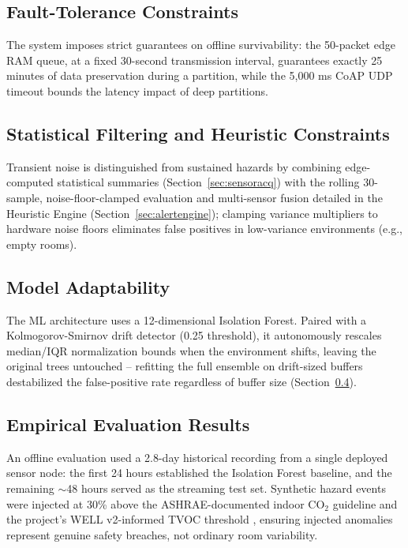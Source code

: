 \documentclass[conference]{IEEEtran}
\begin{document}
\subsection{Fault-Tolerance Constraints}
The system imposes strict guarantees on offline survivability: the 50-packet edge RAM queue, at a fixed 30-second transmission interval, guarantees exactly 25 minutes of data preservation during a partition, while the 5,000 ms CoAP UDP timeout bounds the latency impact of deep partitions.

\subsection{Statistical Filtering and Heuristic Constraints}
Transient noise is distinguished from sustained hazards by combining edge-computed statistical summaries (Section~\ref{sec:sensoracq}) with the rolling 30-sample, noise-floor-clamped evaluation and multi-sensor fusion detailed in the Heuristic Engine (Section~\ref{sec:alertengine}); clamping variance multipliers to hardware noise floors eliminates false positives in low-variance environments (e.g., empty rooms).

\subsection{Model Adaptability}
The ML architecture uses a 12-dimensional Isolation Forest. Paired with a Kolmogorov-Smirnov drift detector (0.25 threshold), it autonomously rescales median/IQR normalization bounds when the environment shifts, leaving the original trees untouched -- refitting the full ensemble on drift-sized buffers destabilized the false-positive rate regardless of buffer size (Section~\ref{sec:mlevalresults}).

\subsection{Empirical Evaluation Results}
\label{sec:mlevalresults}
An offline evaluation used a 2.8-day historical recording from a single deployed sensor node: the first 24 hours established the Isolation Forest baseline, and the remaining $\sim$48 hours served as the streaming test set. Synthetic hazard events were injected at 30\% above the ASHRAE-documented indoor CO$_2$ guideline \cite{b15} and the project's WELL v2-informed TVOC threshold \cite{b5}, ensuring injected anomalies represent genuine safety breaches, not ordinary room variability.
\end{document}
